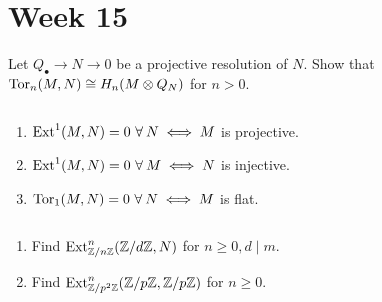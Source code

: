 
\section{Week 15}

\begin{exercise}
  Let $Q_\bullet \to N \to 0$ be a projective resolution of $N$. 
  Show that $\operatorname{Tor}_n(M, N) \cong H_n(M \otimes Q_N)$ for $n > 0$.
\end{exercise}

\begin{exercise}
  $\ $
  \begin{enumerate}
    \item $\Ext^1(M, N) = 0\ \forall N \iff M$ is projective.
    \item $\Ext^1(M, N) = 0\ \forall M \iff N$ is injective.
    \item $\Tor_1(M, N) = 0\ \forall N \iff M$ is flat.
  \end{enumerate}
\end{exercise}

\begin{exercise}
  $\ $
  \begin{enumerate}
    \item Find $\operatorname{Ext}_{\mathbb{Z}/n\mathbb{Z}}^n (\mathbb{Z}/d\mathbb{Z}, N)$ for $n \geq 0, d \mid m$.
    \item Find $\operatorname{Ext}_{\mathbb{Z}/p^2\mathbb{Z}}^n (\mathbb{Z}/p\mathbb{Z}, \mathbb{Z}/p\mathbb{Z})$ for $n \geq 0$.
  \end{enumerate}
\end{exercise}
